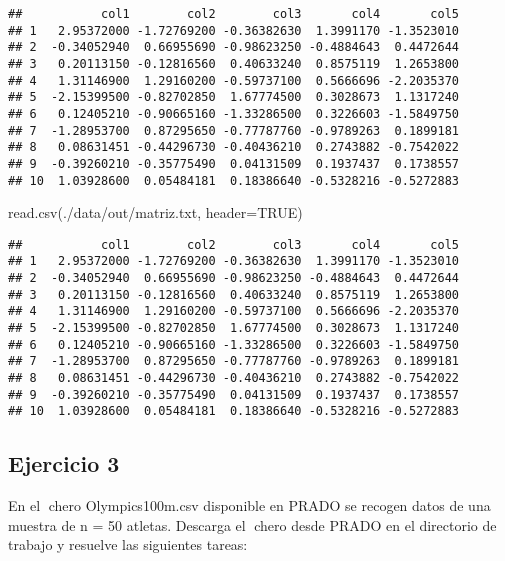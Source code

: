 \documentclass[
]{article}
\newenvironment{Shaded}{\begin{snugshade}}{\end{snugshade}}
\newcommand{\AttributeTok}[1]{\textcolor[rgb]{0.77,0.63,0.00}{#1}}
\newcommand{\ConstantTok}[1]{\textcolor[rgb]{0.00,0.00,0.00}{#1}}
\newcommand{\FunctionTok}[1]{\textcolor[rgb]{0.00,0.00,0.00}{#1}}
\newcommand{\NormalTok}[1]{#1}
\newcommand{\StringTok}[1]{\textcolor[rgb]{0.31,0.60,0.02}{#1}}
\begin{document}
\begin{verbatim}
##           col1        col2        col3       col4       col5
## 1   2.95372000 -1.72769200 -0.36382630  1.3991170 -1.3523010
## 2  -0.34052940  0.66955690 -0.98623250 -0.4884643  0.4472644
## 3   0.20113150 -0.12816560  0.40633240  0.8575119  1.2653800
## 4   1.31146900  1.29160200 -0.59737100  0.5666696 -2.2035370
## 5  -2.15399500 -0.82702850  1.67774500  0.3028673  1.1317240
## 6   0.12405210 -0.90665160 -1.33286500  0.3226603 -1.5849750
## 7  -1.28953700  0.87295650 -0.77787760 -0.9789263  0.1899181
## 8   0.08631451 -0.44296730 -0.40436210  0.2743882 -0.7542022
## 9  -0.39260210 -0.35775490  0.04131509  0.1937437  0.1738557
## 10  1.03928600  0.05484181  0.18386640 -0.5328216 -0.5272883
\end{verbatim}

\begin{Shaded}
\begin{Highlighting}[]
\FunctionTok{read.csv}\NormalTok{(}\StringTok{\textquotesingle{}./data/out/matriz.txt\textquotesingle{}}\NormalTok{, }\AttributeTok{header=}\ConstantTok{TRUE}\NormalTok{)}
\end{Highlighting}
\end{Shaded}

\begin{verbatim}
##           col1        col2        col3       col4       col5
## 1   2.95372000 -1.72769200 -0.36382630  1.3991170 -1.3523010
## 2  -0.34052940  0.66955690 -0.98623250 -0.4884643  0.4472644
## 3   0.20113150 -0.12816560  0.40633240  0.8575119  1.2653800
## 4   1.31146900  1.29160200 -0.59737100  0.5666696 -2.2035370
## 5  -2.15399500 -0.82702850  1.67774500  0.3028673  1.1317240
## 6   0.12405210 -0.90665160 -1.33286500  0.3226603 -1.5849750
## 7  -1.28953700  0.87295650 -0.77787760 -0.9789263  0.1899181
## 8   0.08631451 -0.44296730 -0.40436210  0.2743882 -0.7542022
## 9  -0.39260210 -0.35775490  0.04131509  0.1937437  0.1738557
## 10  1.03928600  0.05484181  0.18386640 -0.5328216 -0.5272883
\end{verbatim}

\hypertarget{ejercicio-3}{%
\subsection{Ejercicio 3}\label{ejercicio-3}}

En el chero Olympics100m.csv disponible en PRADO se recogen datos de
una muestra de n = 50 atletas. Descarga el chero desde PRADO en el
directorio de trabajo y resuelve las siguientes tareas:
\end{document}
